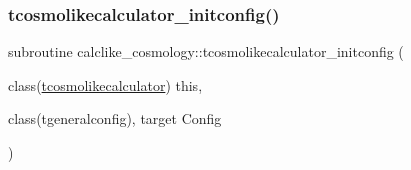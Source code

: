 \subsubsection{\texorpdfstring{tcosmolikecalculator\+\_\+initconfig()}{tcosmolikecalculator\_initconfig()}}
{\footnotesize\ttfamily subroutine calclike\+\_\+cosmology\+::tcosmolikecalculator\+\_\+initconfig (\begin{DoxyParamCaption}\item[{class(\mbox{\hyperlink{structcalclike__cosmology_1_1tcosmolikecalculator}{tcosmolikecalculator}})}]{this,  }\item[{class(tgeneralconfig), target}]{Config }\end{DoxyParamCaption})\hspace{0.3cm}{\ttfamily [private]}}

